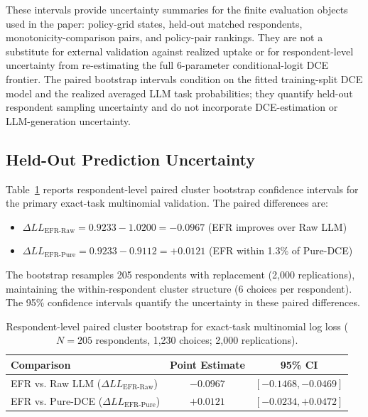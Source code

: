 \documentclass[11pt]{article}
\begin{document}
These intervals provide uncertainty summaries for the finite evaluation objects used in the paper: policy-grid states, held-out matched respondents, monotonicity-comparison pairs, and policy-pair rankings. They are not a substitute for external validation against realized uptake or for respondent-level uncertainty from re-estimating the full 6-parameter conditional-logit DCE frontier. The paired bootstrap intervals condition on the fitted training-split DCE model and the realized averaged LLM task probabilities; they quantify held-out respondent sampling uncertainty and do not incorporate DCE-estimation or LLM-generation uncertainty.

\subsection{Held-Out Prediction Uncertainty}

Table~\ref{tab:S12} reports respondent-level paired cluster bootstrap confidence intervals for the primary exact-task multinomial validation. The paired differences are:
\begin{itemize}
\item $\Delta LL_{\text{EFR-Raw}} = 0.9233 - 1.0200 = -0.0967$ (EFR improves over Raw LLM)
\item $\Delta LL_{\text{EFR-Pure}} = 0.9233 - 0.9112 = +0.0121$ (EFR within 1.3\% of Pure-DCE)
\end{itemize}
The bootstrap resamples 205 respondents with replacement (2,000 replications), maintaining the within-respondent cluster structure (6 choices per respondent). The 95\% confidence intervals quantify the uncertainty in these paired differences.

\begin{table}[h]
\centering
\caption{Respondent-level paired cluster bootstrap for exact-task multinomial log loss ($N = 205$ respondents, 1,230 choices; 2,000 replications).}
\label{tab:S12}
\small
\setlength{\tabcolsep}{8pt}
\begin{tabular}{l c c}
\toprule
\textbf{Comparison} & \textbf{Point Estimate} & \textbf{95\% CI} \\
\midrule
EFR vs. Raw LLM ($\Delta LL_{\text{EFR-Raw}}$) & $-0.0967$ & $[-0.1468, -0.0469]$ \\
EFR vs. Pure-DCE ($\Delta LL_{\text{EFR-Pure}}$) & $+0.0121$ & $[-0.0234, +0.0472]$ \\
\bottomrule
\end{tabular}
\end{table}
\end{document}
